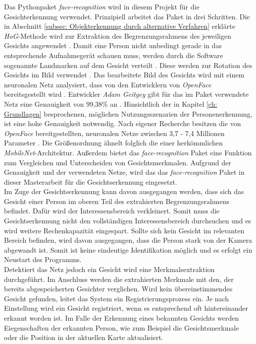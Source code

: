 	Das Pythonpaket \textit{face-recognition} wird in diesem Projekt für die Gesichterkennung verwendet. Prinzipiell arbeitet das Paket in drei Schritten. Die in Abschnitt \ref{subsec: Objekterkennung durch alternative Verfahren} erklärte \textit{HoG}-Methode wird zur Extraktion des Begrenzungsrahmens des jeweiligen Gesichts angewendet \cite{facerecarticle}. Damit eine Person nicht unbedingt gerade in das entsprechende Aufnahmegerät schauen muss, werden durch die Software sogenannte Landmarken auf dem Gesicht verteilt \cite{facerecarticle}. Diese werden zur Rotation des Gesichts im Bild verwendet \cite{facerecarticle}. Das bearbeitete Bild des Gesichts wird mit einem neuronalen Netz analysiert, dass von den Entwicklern von \textit{OpenFace} bereitsgestellt wird \cite{facerecarticle}. Entwickler \textit{Adam Geitgey} gibt für das im Paket verwendete Netz eine Genauigkeit von 99,38$\percent$ an \cite{facerecognition}. Hinsichtlich der in Kapitel \ref{ch: Grundlagen} besprochenen, möglichen Nutzungsszenarien der Personenerkennung, ist eine hohe Genauigkeit notwendig. Nach eigener Recherche besitzen die von \textit{OpenFace} bereitgestellten, neuronalen Netze zwischen 3,7 - 7,4 Millionen Parameter \cite{openface}. Die Größenordnung ähnelt folglich die einer herkömmlichen \textit{MobileNet}-Architektur. Außerdem bietet das \textit{face-recognition} Paket eine Funktion zum Vergleichen und Unterscheiden von Gesichtsmerkmalen. Aufgrund der Genauigkeit und der verwendeten Netze, wird das das \textit{face-recognition} Paket in dieser Masterarbeit für die Gesichtserkennung eingesetzt.\\
	
	Im Zuge der Gesichtserkennung kann davon ausgegangen werden, dass sich das Gesicht einer Person im oberen Teil des extrahierten Begrenzungsrahmens befindet. Dafür wird der Interessensbereich verkleinert. Somit muss die Gesichtserkennung nicht den vollständigen Interessensbereich durchsuchen und es wird weitere Rechenkapazität eingespart. Sollte sich kein Gesicht im relevanten Bereich befinden, wird davon ausgegangen, dass die Person stark von der Kamera abgewandt ist. Somit ist keine eindeutige Identifikation möglich und es erfolgt ein Neustart des Programms.\\
	
	Detektiert das Netz jedoch ein Gesicht wird eine Merkmalsextraktion durchgeführt. Im Anschluss werden die extrahierten Merkmale mit den, der bereits abgespeicherten Gesichter verglichen. Wird kein übereinstimmendes Gesicht gefunden, leitet das System ein Registrierungsprozess ein. Je nach Einstellung wird ein Gesicht registriert, wenn es entsprechend oft hintereinander erkannt worden ist. Im Falle der Erkennung eines bekannten Gesichts werden Eiegenschaften der erkannten Person, wie zum Beispiel die Gesichtsmerkmale oder die Position in der aktuellen Karte aktualisiert. \\ 
	
	  

	

		
	
		
		
				   		

